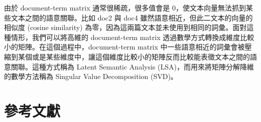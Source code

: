 由於 document-term matrix 通常很稀疏，很多值會是
0，使文本向量無法抓到某些文本之間的語意關聯。比如 doc2 與 doc4
雖然語意相近，但此二文本的向量的相似度 (cosine similarity)
為零，因為這兩篇文本並未使用到相同的詞彙。面對這種情形，我們可以將高維的
document-term matrix
透過數學方式轉換成維度比較小的矩陣。在這個過程中，document-term matrix
中一些語意相近的詞彙會被壓縮到某個或是某些維度中，讓這個維度比較小的矩陣反而比較能表徵文本之間的語意關聯。這種方式稱為
Latent Semantic Analysis (LSA)，而用來將矩陣分解降維的數學方法稱為
Singular Value Decomposition (SVD)。

\begin{Shaded}
\begin{Highlighting}[]
\OtherTok{\textless{}{-}}\SpecialCharTok{::} \NormalTok{)}
\SpecialCharTok{$}

\OtherTok{\textless{}{-}} \NormalTok{(}\SpecialCharTok{$} \NormalTok{)}
\NormalTok{(doc\_sim2[}\NormalTok{, ], }\NormalTok{ T)[}\SpecialCharTok{:}\NormalTok{]}
\end{Highlighting}
\end{Shaded}

\hypertarget{ux53c3ux8003ux6587ux737b}{%
\chapter*{參考文獻}\label{ux53c3ux8003ux6587ux737b}}

